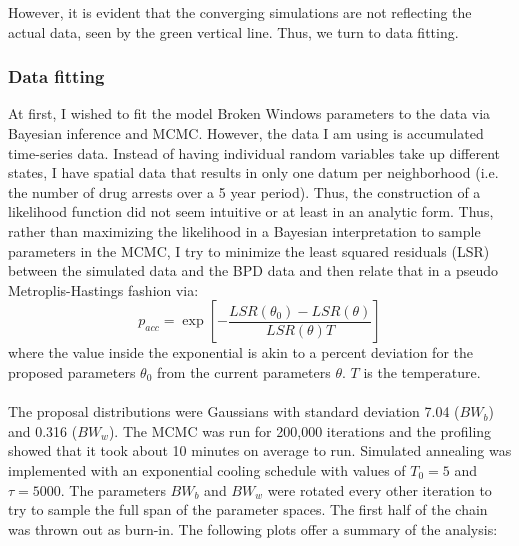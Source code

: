 \documentclass[10pt]{article}
\begin{document}
 However, it is evident that the converging simulations are not reflecting the actual data, seen by the green vertical line. Thus, we turn to data fitting.
 
\subsubsection{Data fitting}
  At first, I wished to fit the model Broken Windows parameters to the data via Bayesian inference and MCMC. However, the data I am using is accumulated time-series data. Instead of having individual random variables take up different states, I have spatial data that results in only one datum per neighborhood (i.e. the number of drug arrests over a 5 year period). Thus, the construction of a likelihood function did not seem intuitive or at least in an analytic form. Thus, rather than maximizing the likelihood in a Bayesian interpretation to sample parameters in the MCMC, I try to minimize the least squared residuals (LSR) between the simulated data and the BPD data and then relate that in a pseudo Metroplis-Hastings fashion via:
  \begin{equation}
  p_{acc} = \exp{[-\frac{LSR(\theta_0) - LSR(\theta)}{LSR(\theta)T}]}
  \end{equation}
  where the value inside the exponential is akin to a percent deviation for the proposed parameters $\theta_0$ from the current parameters $\theta$. $T$ is the temperature.\\
  \\
  The proposal distributions were Gaussians with standard deviation 7.04 ($BW_b$) and 0.316 ($BW_w$). The MCMC was run for 200,000 iterations and the profiling showed that it took about 10 minutes on average to run. Simulated annealing was implemented with an exponential cooling schedule with values of $T_0 = 5$ and $\tau = 5000$. The parameters $BW_b$ and $BW_w$ were rotated every other iteration to try to sample the full span of the parameter spaces. The first half of the chain was thrown out as burn-in. The following plots offer a summary of the analysis:
\end{document}

